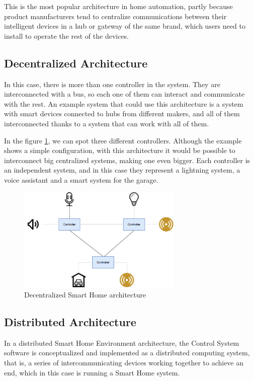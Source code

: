 \bigskip
This is the most popular architecture in home automation, partly because product manufacturers tend to centralize communications
between their intelligent devices in a hub or gateway of the same brand, which users need to install to operate the rest of the devices.

\subsection{Decentralized Architecture}
In this case, there is more than one controller in the system. They are interconnected with a bus, so each one of them can interact
and communicate with the rest. An example system that could use this architecture is a system with smart devices connected to 
hubs from different makers, and all of them interconnected thanks to a system that can work with all of them.

\bigskip
In the figure \ref{fig:decentralized-sh-architecture}, we can spot three different controllers. Although the example shows a simple
configuration, with this architecture it would be possible to interconnect big centralized systems, making one even bigger. Each
controller is an independent system, and in this case they represent a lightning system, a voice assistant and a smart system for
the garage.

\begin{figure}
	\centering
	\includegraphics[width=0.7\textwidth]{images/Chapter_02/decentralized-sh-architecture.png}
	\caption{Decentralized Smart Home architecture}
	\label{fig:decentralized-sh-architecture}
\end{figure}

\subsection{Distributed Architecture}
In a distributed Smart Home Environment architecture, the Control System software is conceptualized and implemented as a 
distributed computing system, that is, a series of intercommunicating devices working together to achieve an end, which in this 
case is running a Smart Home system.

